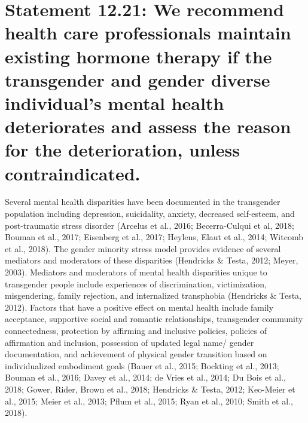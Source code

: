 \documentclass[
]{book}
\begin{document}
\hypertarget{statement-12.21-we-recommend-health-care-professionals-maintain-existing-hormone-therapy-if-the-transgender-and-gender-diverse-individuals-mental-health-deteriorates-and-assess-the-reason-for-the-deterioration-unless-contraindicated.}{%
\section*{Statement 12.21: We recommend health care professionals maintain existing hormone therapy if the transgender and gender diverse individual's mental health deteriorates and assess the reason for the deterioration, unless contraindicated.}\label{statement-12.21-we-recommend-health-care-professionals-maintain-existing-hormone-therapy-if-the-transgender-and-gender-diverse-individuals-mental-health-deteriorates-and-assess-the-reason-for-the-deterioration-unless-contraindicated.}}

Several mental health disparities have been
documented in the transgender population
including depression, suicidality, anxiety,
decreased self-esteem, and post-traumatic stress
disorder (Arcelus et al., 2016; Becerra-Culqui et
al, 2018; Bouman et al., 2017; Eisenberg et al.,
2017; Heylens, Elaut et al., 2014; Witcomb et al.,
2018). The gender minority stress model provides evidence of several mediators and moderators of these disparities (Hendricks \& Testa,
2012; Meyer, 2003). Mediators and moderators
of mental health disparities unique to transgender people include experiences of discrimination,
victimization, misgendering, family rejection, and
internalized transphobia (Hendricks \& Testa,
2012). Factors that have a positive effect on mental health include family acceptance, supportive
social and romantic relationships, transgender
community connectedness, protection by affirming and inclusive policies, policies of affirmation
and inclusion, possession of updated legal name/
gender documentation, and achievement of physical gender transition based on individualized
embodiment goals (Bauer et al., 2015; Bockting
et al., 2013; Bouman et al., 2016; Davey et al.,
2014; de Vries et al., 2014; Du Bois et al., 2018;
Gower, Rider, Brown et al., 2018; Hendricks \&
Testa, 2012; Keo-Meier et al., 2015; Meier et al.,
2013; Pflum et al., 2015; Ryan et al., 2010; Smith
et al., 2018).
\end{document}
